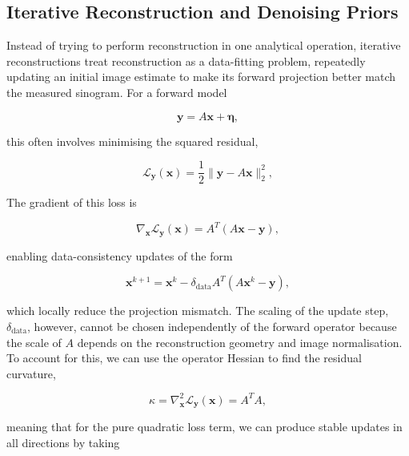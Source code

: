 \subsection{Iterative Reconstruction and Denoising Priors}
\label{subsec:iterative_reconstruction_denoising_priors}

Instead of trying to perform reconstruction in one analytical operation, iterative reconstructions treat reconstruction as a data-fitting problem, repeatedly updating an initial image estimate to make its forward projection better match the measured sinogram. For a forward model

\begin{equation}
\mathbf{y}=A\mathbf{x}+\boldsymbol{\eta},
\label{eq:iterative_forward_model}
\end{equation}

this often involves minimising the squared residual,

\begin{equation}
\mathcal{L}_{\mathbf{y}}(\mathbf{x})
=
\frac{1}{2}
\|\mathbf{y}-A\mathbf{x}\|_2^2,
\label{eq:data_loss}
\end{equation}

The gradient of this loss is

\begin{equation}
\nabla_{\mathbf{x}}\mathcal{L}_{\mathbf{y}}(\mathbf{x})
=
A^T(A\mathbf{x}-\mathbf{y}),
\label{eq:data_loss_gradient}
\end{equation}

enabling data-consistency updates of the form

\begin{equation}
\mathbf{x}^{k+1}
=
\mathbf{x}^k
-
\delta_{\mathrm{data}}
A^T(A\mathbf{x}^k-\mathbf{y}),
\label{eq:data_consistency_update}
\end{equation}

which locally reduce the projection mismatch. The scaling of the update step, $\delta_\text{data}$, however, cannot be chosen independently of the forward operator because the scale of $A$ depends on the reconstruction geometry and image normalisation. To account for this, we can use the operator Hessian to find the residual curvature,

\begin{equation}
\kappa=\nabla_{\mathbf{x}}^2\mathcal{L}_{\mathbf{y}}(\mathbf{x})
=
A^TA,
\label{eq:data_loss_hessian}
\end{equation}

meaning that for the pure quadratic loss term, we can produce stable updates in all directions by taking

